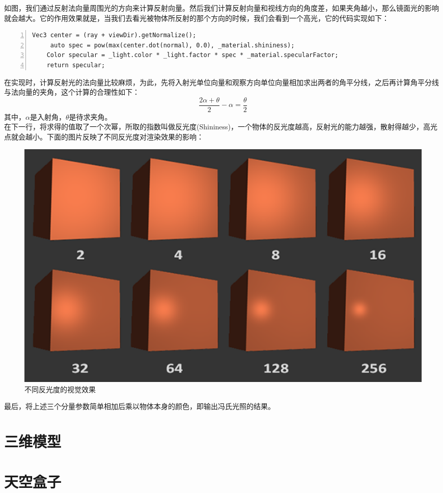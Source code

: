 \begin{spacing}{2.5}
    如图，我们通过反射法向量周围光的方向来计算反射向量。然后我们计算反射向量和视线方向的角度差，如果夹角越小，那么镜面光的影响就会越大。它的作用效果就是，当我们去看光被物体所反射的那个方向的时候，我们会看到一个高光，它的代码实现如下：
    \begin{lstlisting}[language={[ANSI]C},numbers=left,numberstyle=\tiny,%frame=shadowbox,
   rulesepcolor=\color{red!20!green!20!blue!20},
   keywordstyle=\color{blue!70!black},
   commentstyle=\color{blue!90!},
   basicstyle=\ttfamily]
   Vec3 center = (ray + viewDir).getNormalize();
	 auto spec = pow(max(center.dot(normal), 0.0), _material.shininess);
    Color specular = _light.color * _light.factor * spec * _material.specularFactor;
    return specular;
	\end{lstlisting}
    
    在实现时，计算反射光的法向量比较麻烦，为此，先将入射光单位向量和观察方向单位向量相加求出两者的角平分线，之后再计算角平分线与法向量的夹角，这个计算的合理性如下：
   		\begin{equation}
   			\frac{2\alpha+\theta}{2} - \alpha = \frac{\theta}{2}
   		\end{equation}
    其中，$\alpha$是入射角，$\theta$是待求夹角。\\
    在下一行，将求得的值取了一个次幂，所取的指数叫做反光度(Shininess)，一个物体的反光度越高，反射光的能力越强，散射得越少，高光点就会越小。下面的图片反映了不同反光度对渲染效果的影响：
    
    \begin{figure}[H]
    	\centering
		\includegraphics[width=1.0\textwidth]{images/shininess.png}
		\caption{不同反光度的视觉效果}
		\label{shininess}
    \end{figure}
    
    最后，将上述三个分量参数简单相加后乘以物体本身的颜色，即输出冯氏光照的结果。
    	
    \end{spacing}
  

    \section{三维模型}
    
    \section{天空盒子}
    
    
    

